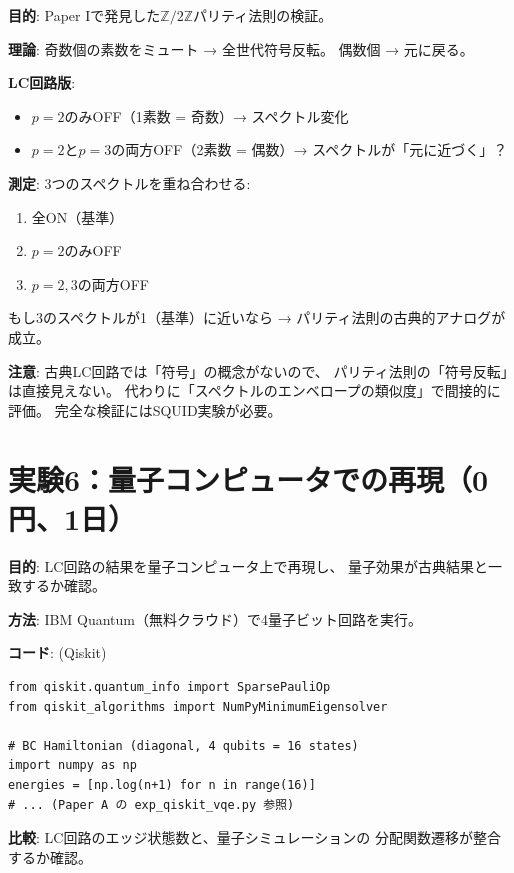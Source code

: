 \documentclass[12pt,a4paper]{article}
\begin{document}
\begin{nextbox}
\textbf{目的}: Paper Iで発見した$\mathbb{Z}/2\mathbb{Z}$パリティ法則の検証。

\textbf{理論}: 奇数個の素数をミュート → 全世代符号反転。
偶数個 → 元に戻る。

\textbf{LC回路版}:
\begin{itemize}
\item $p=2$のみOFF（1素数 = 奇数）→ スペクトル変化
\item $p=2$と$p=3$の両方OFF（2素数 = 偶数）→ スペクトルが「元に近づく」？
\end{itemize}

\textbf{測定}: 3つのスペクトルを重ね合わせる:
\begin{enumerate}
\item 全ON（基準）
\item $p=2$のみOFF
\item $p=2,3$の両方OFF
\end{enumerate}

もし3のスペクトルが1（基準）に近いなら
→ パリティ法則の古典的アナログが成立。

\textbf{注意}: 古典LC回路では「符号」の概念がないので、
パリティ法則の「符号反転」は直接見えない。
代わりに「スペクトルのエンベロープの類似度」で間接的に評価。
完全な検証にはSQUID実験が必要。
\end{nextbox}

\section{実験6：量子コンピュータでの再現（0円、1日）}

\begin{nextbox}
\textbf{目的}: LC回路の結果を量子コンピュータ上で再現し、
量子効果が古典結果と一致するか確認。

\textbf{方法}: IBM Quantum（無料クラウド）で4量子ビット回路を実行。

\textbf{コード}: (Qiskit)

\begin{verbatim}
from qiskit.quantum_info import SparsePauliOp
from qiskit_algorithms import NumPyMinimumEigensolver

# BC Hamiltonian (diagonal, 4 qubits = 16 states)
import numpy as np
energies = [np.log(n+1) for n in range(16)]
# ... (Paper A の exp_qiskit_vqe.py 参照)
\end{verbatim}

\textbf{比較}: LC回路のエッジ状態数と、量子シミュレーションの
分配関数遷移が整合するか確認。
\end{nextbox}
\end{document}
